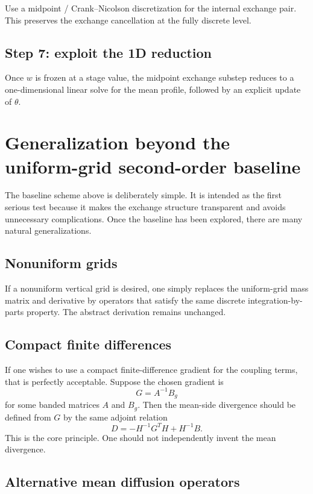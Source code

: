 \documentclass[11pt]{article}
\begin{document}
Use a midpoint / Crank--Nicolson discretization for the internal exchange pair. This preserves the exchange cancellation at the fully discrete level.

\subsection*{Step 7: exploit the 1D reduction}

Once $w$ is frozen at a stage value, the midpoint exchange substep reduces to a one-dimensional linear solve for the mean profile, followed by an explicit update of $\theta$.

\section{Generalization beyond the uniform-grid second-order baseline}

The baseline scheme above is deliberately simple. It is intended as the first serious test because it makes the exchange structure transparent and avoids unnecessary complications. Once the baseline has been explored, there are many natural generalizations.

\subsection{Nonuniform grids}

If a nonuniform vertical grid is desired, one simply replaces the uniform-grid mass matrix and derivative by operators that satisfy the same discrete integration-by-parts property. The abstract derivation remains unchanged.

\subsection{Compact finite differences}

If one wishes to use a compact finite-difference gradient for the coupling terms, that is perfectly acceptable. Suppose the chosen gradient is
\[
G = A^{-1}B_g
\]
for some banded matrices $A$ and $B_g$. Then the mean-side divergence should be defined from $G$ by the same adjoint relation
\[
D = -H^{-1}G^T H + H^{-1}B.
\]
This is the core principle. One should not independently invent the mean divergence.

\subsection{Alternative mean diffusion operators}
\end{document}
